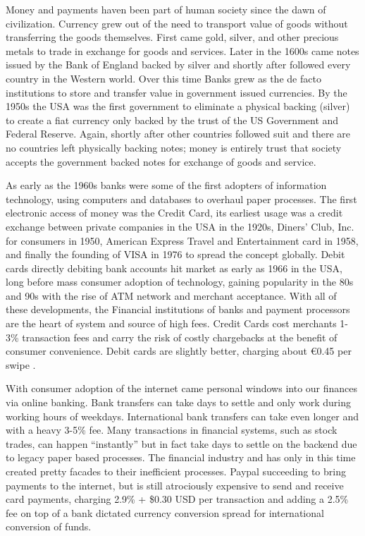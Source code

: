 \documentclass[a4paper,12pt]{article} %
\begin{document}
Money and payments haven been part of human society since the dawn of civilization. Currency grew out of the need to transport value of goods without transferring the goods themselves. First came gold, silver, and other precious metals to trade in exchange for goods and services. Later in the 1600s came notes issued by the Bank of England backed by silver and shortly after followed every country in the Western world. Over this time Banks grew as the de facto institutions to store and transfer value in government issued currencies. By the 1950s the USA was the first government to eliminate a physical backing (silver) to create a fiat currency only backed by the trust of the US Government and Federal Reserve. Again, shortly after other countries followed suit and there are no countries left physically backing notes; money is entirely trust that society accepts the government backed notes for exchange of goods and service.

As early as the 1960s banks were some of the first adopters of information technology, using computers and databases to overhaul paper processes. The first electronic access of money was the Credit Card, its earliest usage was a credit exchange between private companies in the USA in the 1920s, Diners’ Club, Inc. for consumers in 1950, American Express Travel and Entertainment card in 1958, and finally the founding of VISA in 1976 to spread the concept globally\cite{britannica2016creditcard}. Debit cards directly debiting bank accounts hit market as early as 1966 in the USA, long before mass consumer adoption of technology, gaining popularity in the 80s and 90s with the rise of ATM network and merchant acceptance\cite{collins2011debitcard}. With all of these developments, the Financial institutions of banks and payment processors are the heart of system and source of high fees. Credit Cards cost  merchants 1-3\% transaction fees and carry the risk of costly chargebacks at the benefit of consumer convenience. Debit cards are slightly better, charging about \euro0.45 per swipe \cite{kaarmann2014government}.

With consumer adoption of the internet came personal windows into our finances via online banking. Bank transfers can take days to settle and only work during working hours of weekdays. International bank transfers can take even longer and with a heavy 3-5\% fee.  Many transactions in financial systems, such as stock trades, can happen ``instantly'' but in fact take days to settle on the backend due to legacy paper based processes. The financial industry and has only in this time created pretty facades to their inefficient processes. Paypal succeeding to bring payments to the internet, but is still atrociously expensive to send and receive card payments, charging 2.9\% + \$0.30 USD per transaction and adding a 2.5\% fee on top of a bank dictated currency conversion spread for international conversion of funds\cite{paypal2017fees}.
\end{document}
